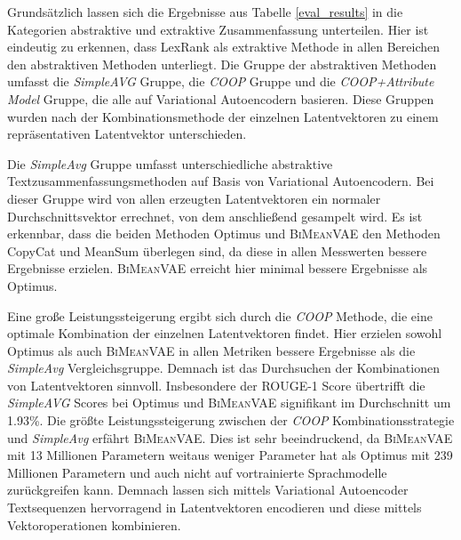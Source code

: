 Grundsätzlich lassen sich die Ergebnisse aus Tabelle \ref{eval_results} in die Kategorien abstraktive und extraktive Zusammenfassung unterteilen.
Hier ist eindeutig zu erkennen, dass LexRank als extraktive Methode in allen Bereichen den abstraktiven Methoden unterliegt. 
Die Gruppe der abstraktiven Methoden umfasst die \textit{SimpleAVG} Gruppe, die \textit{COOP} Gruppe und die \textit{COOP+Attribute Model} Gruppe, die alle auf Variational Autoencodern basieren.
Diese Gruppen wurden nach der Kombinationsmethode der einzelnen Latentvektoren zu einem repräsentativen Latentvektor unterschieden.

Die \textit{SimpleAvg} Gruppe umfasst unterschiedliche abstraktive Textzusammenfassungsmethoden auf Basis von Variational Autoencodern.
Bei dieser Gruppe wird von allen erzeugten Latentvektoren ein normaler Durchschnittsvektor errechnet, von dem anschließend gesampelt wird.
Es ist erkennbar, dass die beiden Methoden Optimus und \textsc{BiMeanVAE} den Methoden CopyCat und MeanSum überlegen sind, da diese in allen Messwerten bessere Ergebnisse erzielen.
\textsc{BiMeanVAE} erreicht hier minimal bessere Ergebnisse als Optimus.


Eine große Leistungssteigerung ergibt sich durch die \textit{COOP} Methode, die eine optimale Kombination der einzelnen Latentvektoren findet.
Hier erzielen sowohl Optimus als auch \textsc{BiMeanVAE} in allen Metriken bessere Ergebnisse als die \textit{SimpleAvg} Vergleichsgruppe.
Demnach ist das Durchsuchen der Kombinationen von Latentvektoren sinnvoll. 
Insbesondere der ROUGE-1 Score übertrifft die \textit{SimpleAVG} Scores bei Optimus und \textsc{BiMeanVAE} signifikant im Durchschnitt um 1.93\%.  %
Die größte Leistungssteigerung zwischen der \textit{COOP} Kombinationsstrategie und \textit{SimpleAvg} erfährt \textsc{BiMeanVAE}.
Dies ist sehr beeindruckend, da \textsc{BiMeanVAE} mit 13 Millionen Parametern weitaus weniger Parameter hat als Optimus mit 239 Millionen Parametern und auch nicht auf vortrainierte Sprachmodelle zurückgreifen kann.
Demnach lassen sich mittels Variational Autoencoder Textsequenzen hervorragend in Latentvektoren encodieren und diese mittels Vektor\-operationen kombinieren.



\small
\newlength{\DepthReference}
\setlength{\DepthReference}{1pt}%

